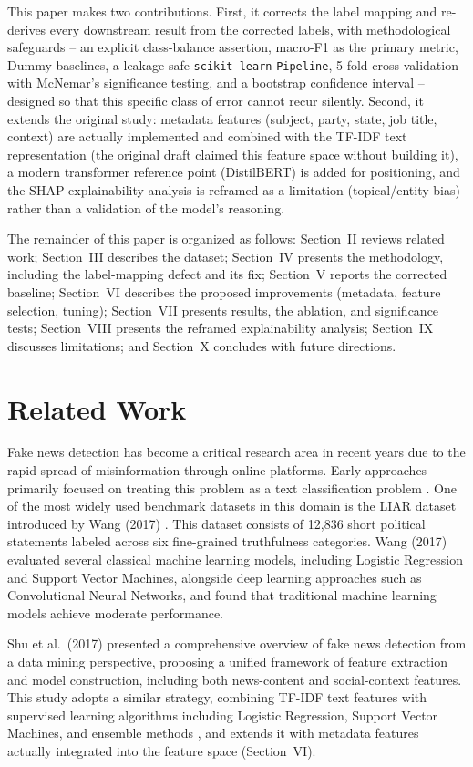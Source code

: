 \documentclass[conference]{IEEEtran}
\begin{document}
This paper makes two contributions. First, it corrects the label mapping and
re-derives every downstream result from the corrected labels, with methodological
safeguards -- an explicit class-balance assertion, macro-F1 as the primary metric,
Dummy baselines, a leakage-safe \texttt{scikit-learn} \texttt{Pipeline}, 5-fold
cross-validation with McNemar's significance testing, and a bootstrap confidence
interval -- designed so that this specific class of error cannot recur silently.
Second, it extends the original study: metadata features (subject, party, state,
job title, context) are actually implemented and combined with the TF-IDF text
representation (the original draft claimed this feature space without building it),
a modern transformer reference point (DistilBERT) is added for positioning, and the
SHAP explainability analysis is reframed as a limitation (topical/entity bias)
rather than a validation of the model's reasoning.

The remainder of this paper is organized as follows: Section~II reviews related
work; Section~III describes the dataset; Section~IV presents the methodology,
including the label-mapping defect and its fix; Section~V reports the corrected
baseline; Section~VI describes the proposed improvements (metadata, feature
selection, tuning); Section~VII presents results, the ablation, and significance
tests; Section~VIII presents the reframed explainability analysis; Section~IX
discusses limitations; and Section~X concludes with future directions.

\section{Related Work}
Fake news detection has become a critical research area in recent years due to the
rapid spread of misinformation through online platforms. Early approaches primarily
focused on treating this problem as a text classification problem
\cite{conroy2015, shu2017}. One of the most widely used benchmark datasets in this
domain is the LIAR dataset introduced by Wang (2017) \cite{wang2017}. This dataset
consists of 12,836 short political statements labeled across six fine-grained
truthfulness categories. Wang (2017) evaluated several classical machine learning
models, including Logistic Regression and Support Vector Machines, alongside deep
learning approaches such as Convolutional Neural Networks, and found that
traditional machine learning models achieve moderate performance.

Shu et al.\ (2017) \cite{shu2017} presented a comprehensive overview of fake news
detection from a data mining perspective, proposing a unified framework of feature
extraction and model construction, including both news-content and social-context
features. This study adopts a similar strategy, combining TF-IDF text features with
supervised learning algorithms including Logistic Regression, Support Vector
Machines, and ensemble methods \cite{sharma2020}, and extends it with metadata
features actually integrated into the feature space (Section~VI).
\end{document}
